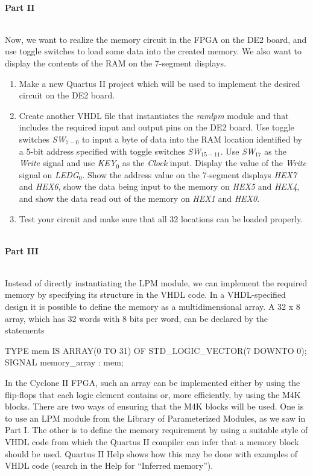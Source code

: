 \documentclass[psfig,10pt,fullpage]{article}
\begin{document}
~\\
\noindent
{\bf Part II}

~\\
\noindent
Now, we want to realize the memory circuit in the FPGA on the DE2 board, and 
use toggle switches to load some data into 
the created memory. We also want to display the contents of the RAM on the 7-segment displays.
\begin{enumerate}
\item Make a new Quartus II project which will be used to 
implement the desired circuit on the DE2 board.
\item Create another VHDL file that instantiates the {\it ramlpm} module and that
includes the required input and output pins on the DE2 board. 
Use toggle switches {\it SW}$_{7-0}$ to input a byte of
data into the RAM location identified by a 5-bit address specified with
toggle switches {\it SW}$_{15-11}$. Use {\it SW}$_{17}$ as the {\it Write} signal and
use {\it KEY}$_0$ as the {\it Clock} input. 
Display the value of the {\it Write} signal on {\it LEDG}$_0$. 
Show the address value on the 7-segment displays {\it HEX7} and {\it HEX6}, show the
data being input to the memory on {\it HEX5} and {\it HEX4}, and show the data read out
of the memory on {\it HEX1} and {\it HEX0}. 
\item Test your circuit and make sure that all 32 locations can be loaded properly.
\end{enumerate}

~\\
\noindent
{\bf Part III}

~\\
\noindent
Instead of directly instantiating the LPM module, we can implement the required memory by
specifying its structure in the VHDL code.
In a VHDL-specified design it is possible to define the memory as a
multidimensional array. A 32 {\sf x} 8 array, which has 32 words with
8 bits per word, can be declared by the statements

\begin{center}
\begin{minipage}[t]{12.5 cm}
\begin{tabbing}
TYPE mem IS ARRAY(0 TO 31) OF STD\_LOGIC\_VECTOR(7 DOWNTO 0);\\
SIGNAL memory\_array : mem;
\end{tabbing}
\end{minipage}
\end{center}

\noindent
In the Cyclone II FPGA, such an array can be implemented either by using
the flip-flops that each logic element contains or, more efficiently, 
by using the M4K blocks.
There are two ways of ensuring that the M4K blocks will be used.
One is to use an LPM module from the Library of Parameterized Modules,
as we saw in Part I.
The other is to define the memory requirement by using a suitable style
of VHDL code from which the Quartus II compiler can infer that a memory
block should be used. Quartus II Help shows how this may be done with examples
of VHDL code (search in the Help for ``Inferred memory''). 
\end{document}
